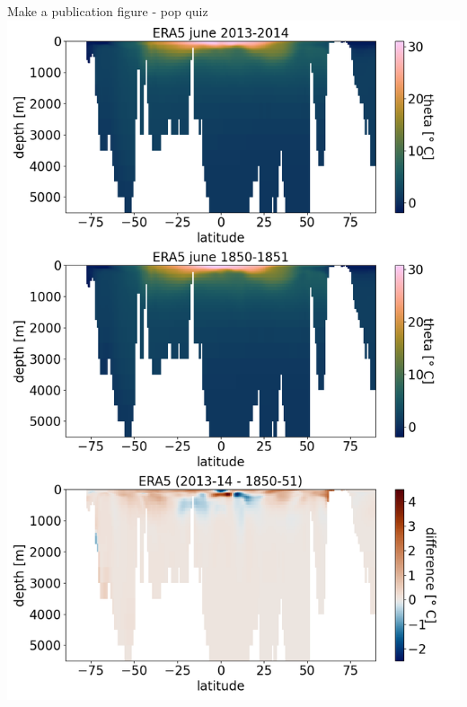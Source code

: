 \begin{frame}{\insertsectionnumber{ |} Make a publication figure - pop quiz} 
    \centering\includegraphics[scale=0.22]{images/script6_fig1.png}\\
\end{frame}


